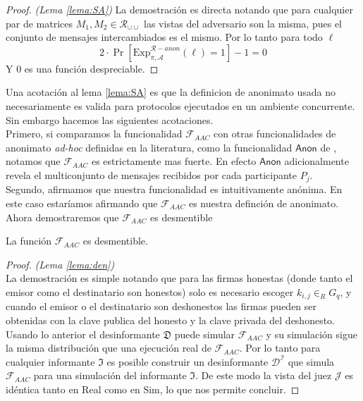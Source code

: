 \begin{proof}
\textit{(Lema \ref{lema:SA})}
La demostración es directa notando que para cualquier par de matrices $M_1, M_2 \in \mathcal{R}_{\cup\cup}$ las
vistas del adversario son la misma, pues el conjunto de mensajes intercambiados es el mismo. Por lo tanto para todo $\ell$
$$2\cdot\Pr[\mathrm{Exp}_{\pi, \mathcal{A}}^{\mathcal{R}-anon}(\ell) = 1] - 1 = 0$$
Y 0 es una función despreciable.
\end{proof}

Una acotación al lema \ref{lema:SA} es que la definicion de anonimato usada no necesariamente es
valida para protocolos ejecutados en un ambiente concurrente. Sin embargo hacemos las siguientes
acotaciones.\\
Primero, si comparamos la funcionalidad $\mathcal{F}_{AAC}$ con otras funcionalidades
de anonimato \textit{ad-hoc} definidas en la literatura, como la funcionalidad $\mathsf{Anon}$ de
\cite{IshaiEtAl06}, notamos que $\mathcal{F}_{AAC}$ es estrictamente mas fuerte. En efecto
$\mathsf{Anon}$ adicionalmente revela el multiconjunto de mensajes recibidos por cada participante
$P_j$.\\
Segundo, afirmamos que nuestra funcionalidad es intuitivamente anónima. En este caso estaríamos
afirmando que $\mathcal{F}_{AAC}$ es nuestra definción de anonimato.\\

Ahora demostraremos que $\mathcal{F}_{AAC}$ es desmentible

\begin{lema}
La función $\mathcal{F}_{AAC}$ es desmentible.
\label{lema:den}
\end{lema}

\begin{proof}
\textit{(Lema \ref{lema:den})}\\
La demostración es simple notando que para las firmas honestas (donde tanto el emisor como el destinatario son
honestos) solo es necesario escoger $k_{i, j} \in_R G_q$, y cuando el emisor o el destinatario son deshonestos
las firmas pueden ser obtenidas con la clave publica del honesto y la clave privada del deshonesto. Usando
lo anterior el desinformante $\mathfrak{D}$ puede simular $\mathcal{F}_{AAC}$ y su simulación sigue la misma
distribución que una ejecución real de $\mathcal{F}_{AAC}$. Por lo tanto para cualquier informante $\mathfrak{I}$
es posible construir un desinformante $\mathcal{D^I}$ que simula $\mathcal{F}_{AAC}$ para una simulación
del informante $\mathfrak{I}$. De este modo la vista del juez $\mathcal{J}$ es idéntica tanto en Real como
en Sim, lo que nos permite concluir. 
\end{proof}


